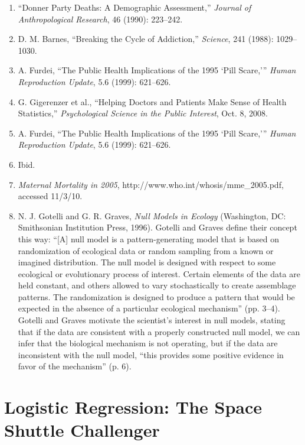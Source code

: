 \documentclass[
]{report}
\begin{document}
\begin{enumerate}
\item “Donner Party Deaths: A Demographic Assessment,” \textit{Journal of Anthropological Research}, 46 (1990): 223–242.
\item D. M. Barnes, “Breaking the Cycle of Addiction,” \textit{Science}, 241 (1988): 1029–1030.
\item A. Furdei, “The Public Health Implications of the 1995 ‘Pill Scare,’” \textit{Human Reproduction Update}, 5.6 (1999): 621–626.
\item G. Gigerenzer et al., “Helping Doctors and Patients Make Sense of Health Statistics,” \textit{Psychological Science in the
Public Interest}, Oct. 8, 2008.
\item A. Furdei, “The Public Health Implications of the 1995 ‘Pill Scare,’” \textit{Human Reproduction Update}, 5.6 (1999):
621–626.
\item Ibid.
\item \textit{Maternal Mortality in 2005}, http://www.who.int/whosis/mme\_2005.pdf, accessed 11/3/10.
\item N. J. Gotelli and G. R. Graves, \textit{Null Models in Ecology} (Washington, DC: Smithsonian Institution Press, 1996).
Gotelli and Graves define their concept this way: “[A] null model is a pattern-generating model that is based on
randomization of ecological data or random sampling from a known or imagined distribution. The null model is
designed with respect to some ecological or evolutionary process of interest. Certain elements of the data are held
constant, and others allowed to vary stochastically to create assemblage patterns. The randomization is designed to
produce a pattern that would be expected in the absence of a particular ecological mechanism” (pp. 3–4). Gotelli
and Graves motivate the scientist’s interest in null models, stating that if the data are consistent with a properly
constructed null model, we can infer that the biological mechanism is not operating, but if the data are inconsistent
with the null model, “this provides some positive evidence in favor of the mechanism” (p. 6).

\end{enumerate}

\hypertarget{logistic-regression-the-space-shuttle-challenger}{%
\chapter{Logistic Regression: The Space Shuttle Challenger}\label{logistic-regression-the-space-shuttle-challenger}}
\end{document}
